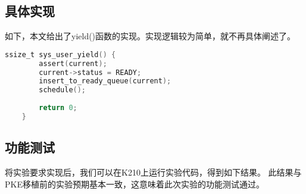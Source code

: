 \subsection{具体实现}

如下，本文给出了yield()函数的实现。实现逻辑较为简单，就不再具体阐述了。

\begin{lstlisting}[caption={yield}, label={lst:yield}, language=C]
    ssize_t sys_user_yield() {
        assert(current);
        current->status = READY;
        insert_to_ready_queue(current);
        schedule();
    
        return 0;
    }    
\end{lstlisting}

\subsection{功能测试}

将实验要求实现后，我们可以在K210上运行实验代码，得到如下结果。
此结果与PKE移植前的实验预期基本一致，这意味着此次实验的功能测试通过。

